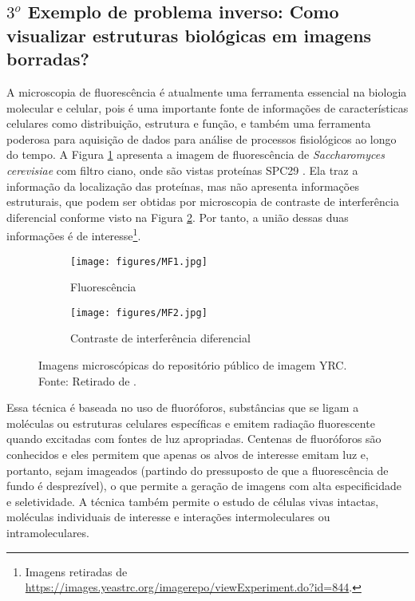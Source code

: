 \subsection{$3^o$ Exemplo de problema inverso: Como visualizar estruturas biológicas em imagens borradas?}

A microscopia de fluorescência é atualmente uma ferramenta essencial na biologia molecular e celular, pois é uma importante fonte de informações de características celulares como distribuição, estrutura e função, e também uma ferramenta poderosa para aquisição de dados para análise de processos fisiológicos ao longo do tempo.  A Figura \ref{fig:mf1a} apresenta a imagem de fluorescência de \textit{Saccharomyces cerevisiae} com filtro ciano, onde são vistas proteínas SPC29 \cite{Riffle2010}. Ela traz a informação da localização das proteínas, mas não apresenta informações estruturais, que podem ser obtidas por microscopia de contraste de interferência diferencial conforme visto na Figura \ref{fig:mf2b}. Por tanto, a união dessas duas informações é de interesse\footnote{Imagens retiradas de \url{https://images.yeastrc.org/imagerepo/viewExperiment.do?id=844}.}.


 \begin{figure}[H]
     \centering
   \begin{subfigure}[b]{0.49\textwidth}
         \centering
         \texttt{[image: figures/MF1.jpg]}
         \caption{Fluorescência}
                  \label{fig:mf1a}
      \end{subfigure}
     \hfill
     \begin{subfigure}[b]{0.49\textwidth}
         \centering
                  \texttt{[image: figures/MF2.jpg]}
         \caption{Contraste de interferência diferencial}
                  \label{fig:mf2b}
       \end{subfigure}
     \caption[Imagens microscópicas do repositório público de imagem YRC.]{Imagens microscópicas do repositório público de imagem YRC. Fonte: Retirado de \cite{Riffle2010}.}
     \label{fig:fluorescence}
 \end{figure}

Essa técnica é baseada no uso de fluoróforos, substâncias que se ligam a moléculas ou estruturas celulares específicas e emitem radiação fluorescente quando excitadas com fontes de luz apropriadas. Centenas de fluoróforos são conhecidos e eles permitem que apenas os alvos de interesse emitam luz e, portanto, sejam imageados (partindo do pressuposto de que a fluorescência de fundo é desprezível), o que permite a geração de imagens com alta especificidade e seletividade. A técnica também permite o estudo de células vivas intactas, moléculas individuais de interesse e interações intermoleculares ou intramoleculares. 

